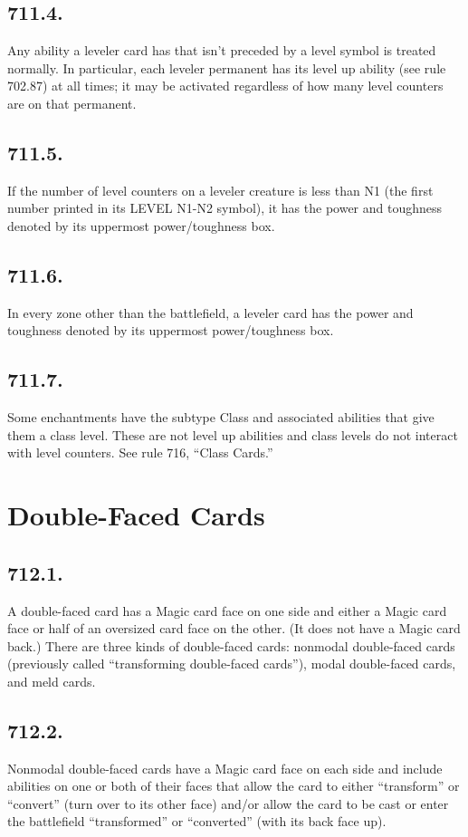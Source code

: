 \subsection*{711.4.}
Any ability a leveler card has that isn’t preceded by a level symbol is treated normally. In particular, each leveler permanent has its level up ability (see rule 702.87) at all times; it may be activated regardless of how many level counters are on that permanent.

\subsection*{711.5.}
If the number of level counters on a leveler creature is less than N1 (the first number printed in its {LEVEL N1-N2} symbol), it has the power and toughness denoted by its uppermost power/toughness box.

\subsection*{711.6.}
In every zone other than the battlefield, a leveler card has the power and toughness denoted by its uppermost power/toughness box.

\subsection*{711.7.}
Some enchantments have the subtype Class and associated abilities that give them a class level. These are not level up abilities and class levels do not interact with level counters. See rule 716, “Class Cards.”

\section{Double-Faced Cards}
\subsection*{712.1.}
A double-faced card has a Magic card face on one side and either a Magic card face or half of an oversized card face on the other. (It does not have a Magic card back.) There are three kinds of double-faced cards: nonmodal double-faced cards (previously called “transforming double-faced cards”), modal double-faced cards, and meld cards.

\subsection*{712.2.}
Nonmodal double-faced cards have a Magic card face on each side and include abilities on one or both of their faces that allow the card to either “transform” or “convert” (turn over to its other face) and/or allow the card to be cast or enter the battlefield “transformed” or “converted” (with its back face up).


